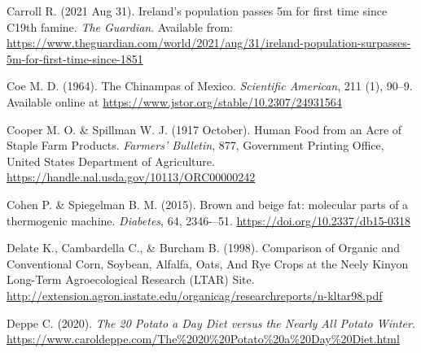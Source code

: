 \documentclass[man]{apa7}
\begin{document}
\begin{thebibliography}{99}
Carroll R.
(2021 Aug 31).
Ireland’s population passes 5m for first time since C19th famine.
\textit{The Guardian}.
Available from: \url{https://www.theguardian.com/world/2021/aug/31/ireland-population-surpasses-5m-for-first-time-since-1851}


Coe M. D.
(1964).
The Chinampas of Mexico.
\textit{Scientific American}, 211 (1), 90--9.
Available online at \url{https://www.jstor.org/stable/10.2307/24931564}

Cooper  M. O. \& Spillman W. J. 
(1917 October).
Human Food from an Acre of Staple Farm Products.
\textit{Farmers' Bulletin}, 
877,
Government Printing Office, United States Department of Agriculture.
\url{https://handle.nal.usda.gov/10113/ORC00000242}

Cohen P. \& Spiegelman B. M.
(2015).
Brown and beige fat: molecular parts of a thermogenic machine.
\textit{Diabetes},
64,
2346-–51.
\url{https://doi.org/10.2337/db15-0318}

Delate K., Cambardella C., \& Burcham B.
(1998).
Comparison of Organic and Conventional Corn, 
Soybean, Alfalfa, Oats, And Rye Crops at the Neely Kinyon Long-Term Agroecological Research (LTAR) Site.
\url{http://extension.agron.iastate.edu/organicag/researchreports/n-kltar98.pdf} 


Deppe C.
(2020).
\textit{The 20 Potato a Day Diet versus the Nearly All Potato Winter}.
\url{https://www.caroldeppe.com/The\%2020\%20Potato\%20a\%20Day\%20Diet.html}


\end{thebibliography}
\end{document}
